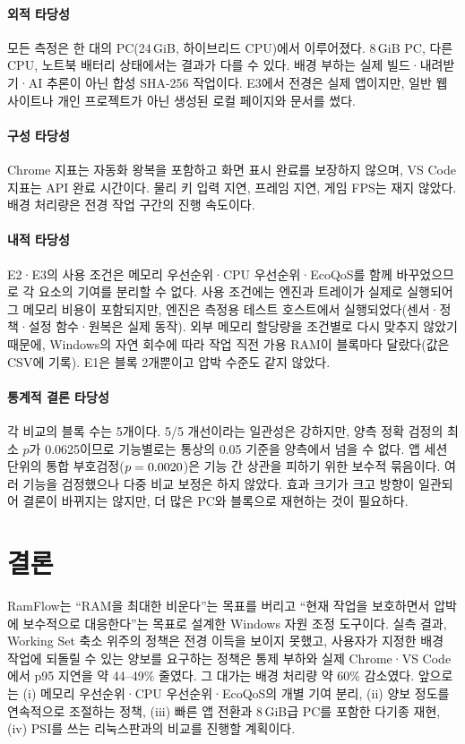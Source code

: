 \documentclass[11pt]{article}
\begin{document}
\paragraph{외적 타당성}
모든 측정은 한 대의 PC(24\,GiB, 하이브리드 CPU)에서 이루어졌다. 8\,GiB PC, 다른 CPU, 노트북 배터리 상태에서는 결과가 다를 수 있다. 배경 부하는 실제 빌드·내려받기·AI 추론이 아닌 합성 SHA-256 작업이다. E3에서 전경은 실제 앱이지만, 일반 웹사이트나 개인 프로젝트가 아닌 생성된 로컬 페이지와 문서를 썼다.

\paragraph{구성 타당성}
Chrome 지표는 자동화 왕복을 포함하고 화면 표시 완료를 보장하지 않으며, VS Code 지표는 API 완료 시간이다. 물리 키 입력 지연, 프레임 지연, 게임 FPS는 재지 않았다. 배경 처리량은 전경 작업 구간의 진행 속도이다.

\paragraph{내적 타당성}
E2·E3의 사용 조건은 메모리 우선순위·CPU 우선순위·EcoQoS를 함께 바꾸었으므로 각 요소의 기여를 분리할 수 없다. 사용 조건에는 엔진과 트레이가 실제로 실행되어 그 메모리 비용이 포함되지만, 엔진은 측정용 테스트 호스트에서 실행되었다(센서·정책·설정 함수·원복은 실제 동작). 외부 메모리 할당량을 조건별로 다시 맞추지 않았기 때문에, Windows의 자연 회수에 따라 작업 직전 가용 RAM이 블록마다 달랐다(값은 CSV에 기록). E1은 블록 2개뿐이고 압박 수준도 같지 않았다.

\paragraph{통계적 결론 타당성}
각 비교의 블록 수는 5개이다. 5/5 개선이라는 일관성은 강하지만, 양측 정확 검정의 최소 $p$가 0.0625이므로 기능별로는 통상의 0.05 기준을 양측에서 넘을 수 없다. 앱 세션 단위의 통합 부호검정($p=0.0020$)은 기능 간 상관을 피하기 위한 보수적 묶음이다. 여러 기능을 검정했으나 다중 비교 보정은 하지 않았다. 효과 크기가 크고 방향이 일관되어 결론이 바뀌지는 않지만, 더 많은 PC와 블록으로 재현하는 것이 필요하다.

\section{결론}
\label{sec:conclusion}

RamFlow는 ``RAM을 최대한 비운다''는 목표를 버리고 ``현재 작업을 보호하면서 압박에 보수적으로 대응한다''는 목표로 설계한 Windows 자원 조정 도구이다. 실측 결과, Working Set 축소 위주의 정책은 전경 이득을 보이지 못했고, 사용자가 지정한 배경 작업에 되돌릴 수 있는 양보를 요구하는 정책은 통제 부하와 실제 Chrome·VS Code에서 p95 지연을 약 44--49\% 줄였다. 그 대가는 배경 처리량 약 60\% 감소였다. 앞으로는 (i) 메모리 우선순위·CPU 우선순위·EcoQoS의 개별 기여 분리, (ii) 양보 정도를 연속적으로 조절하는 정책, (iii) 빠른 앱 전환과 8\,GiB급 PC를 포함한 다기종 재현, (iv) PSI를 쓰는 리눅스판과의 비교를 진행할 계획이다.
\end{document}
